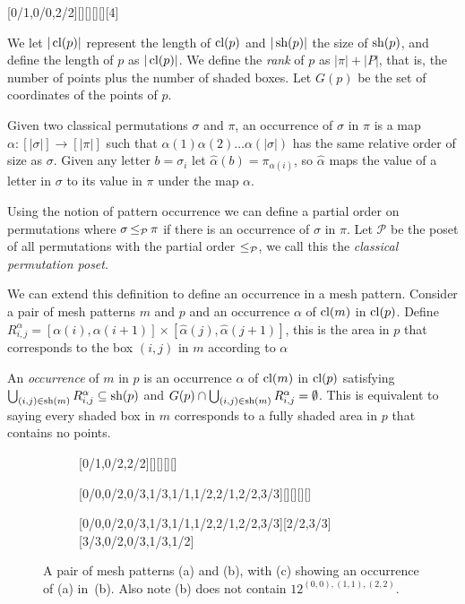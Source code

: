 \documentclass[11pt,a4paper,oneside]{article}
\begin{document}
\begin{center}
[0/1,0/0,2/2][][][][][4]
\end{center}

We let $|\operatorname{\textrm{cl}}(p)|$ represent the length of $\operatorname{\textrm{cl}}(p)$ and $|\operatorname{\textrm{sh}}(p)|$ the size of
$\operatorname{\textrm{sh}}(p)$, and define the length of $p$ as $|\operatorname{\textrm{cl}}(p)|$. We define the \emph{rank}
of $p$ as $|\pi|+|P|$, that is, the number of points plus the number of shaded
boxes. Let $G(p)$ be the set of coordinates of
the points of $p$.

Given two classical permutations $\sigma$ and $\pi$, an occurrence of $\sigma$
in $\pi$ is a map $\alpha:[|\sigma|]\rightarrow[|\pi|]$ such that
$\alpha(1)\alpha(2)\ldots\alpha(|\sigma|)$ has the same relative order of size
as $\sigma$. Given any letter $b=\sigma_i$ let
$\hat{\alpha}(b)=\pi_{\alpha(i)}$, so $\hat{\alpha}$ maps the value of a letter
in $\sigma$ to its value in $\pi$ under the map $\alpha$.

Using the notion of pattern occurrence we can define a partial order on
permutations where $\sigma\operatorname{\le_{\mathcal{P}}}\pi$ if there is an occurrence of $\sigma$ in
$\pi$. Let $\mathcal{P}$ be the poset of all permutations with the partial order
$\operatorname{\le_{\mathcal{P}}}$, we call this the \emph{classical permutation poset}.

We can extend this definition to define an occurrence in a mesh pattern.
Consider a pair of mesh patterns $m$ and $p$ and an occurrence $\alpha$ of
$\operatorname{\textrm{cl}}(m)$ in $\operatorname{\textrm{cl}}(p)$. Define
$R^\alpha_{i,j}=[\alpha(i),\alpha(i+1)]\times[\hat{\alpha}(j),\hat{\alpha}(j+1)]$,
this is the area in $p$ that corresponds to the box $(i,j)$ in $m$ according to
$\alpha$

An \emph{occurrence} of $m$ in $p$ is an occurrence $\alpha$ of $\operatorname{\textrm{cl}}(m)$ in
$\operatorname{\textrm{cl}}(p)$ satisfying $\bigcup_{(i,j)\in \operatorname{\textrm{sh}}(m)}R^\alpha_{i,j}\subseteq\operatorname{\textrm{sh}}(p)$ and
$G(p)\cap\bigcup_{(i,j)\in \operatorname{\textrm{sh}}(m)}R^\alpha_{i,j}=\emptyset$. This is equivalent
to saying every shaded box in $m$ corresponds to a fully shaded area in $p$
that contains no points.

\begin{figure}\centering
\begin{subfigure}[b]{0.3\textwidth}
\centering{}[0/1,0/2,2/2][][][][]
\caption{}\label{subfiga}\end{subfigure}
\begin{subfigure}[b]{0.3\textwidth}
\centering{}[0/0,0/2,0/3,1/3,1/1,1/2,2/1,2/2,3/3][][][][]
\caption{}\label{subfigb}\end{subfigure}
\begin{subfigure}[b]{0.3\textwidth}\centering
{}[0/0,0/2,0/3,1/3,1/1,1/2,2/1,2/2,3/3][2/2,3/3][3/3,0/2,0/3,1/3,1/2]
\caption{}\label{subfigc}\end{subfigure}
\caption{A pair of mesh patterns (a) and (b), with (c) showing an occurrence of (a) in~(b).
 Also note (b) does not contain $12^{(0,0),(1,1),(2,2)}$.}\label{fig:occEx}
\end{figure}
\end{document}
